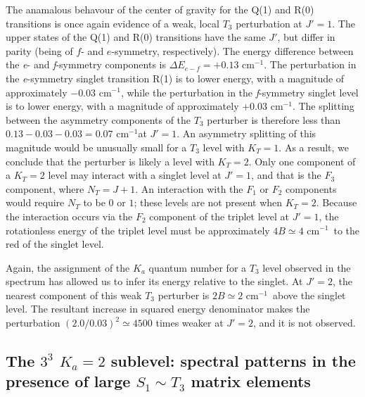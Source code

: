 \documentclass[12pt]{mitthesis}
\newcommand{\rcm}{cm$^{-1}$}
\newcommand{\Ka}[1]{$K_a\!\!=\!#1$}
\begin{document}
The anamalous behavour of the center of gravity for the Q(1) and R(0)
transitions is once again evidence of a weak, local $T_3$ perturbation
at $J'=1$.  The upper states of the Q(1) and R(0) transitions have the
same $J'$, but differ in parity (being of $f$- and $e$-symmetry,
respectively).  The energy difference between the \emph{e}- and
\emph{f}-symmetry components is $\Delta E_{e-f}=+0.13$ \rcm.  The
perturbation in the \emph{e}-symmetry singlet transition R(1) is to
lower energy, with a magnitude of approximately $-0.03$ \rcm, while
the perturbation in the \emph{f}-symmetry singlet level is to lower
energy, with a magnitude of approximately $+0.03$ \rcm.  The splitting
between the asymmetry components of the $T_3$ perturber is therefore
less than $0.13-0.03-0.03=0.07$ \rcm at $J'=1$.  An asymmetry
splitting of this magnitude would be unusually small for a $T_3$ level
with $K_T=1$.  As a result, we conclude that the perturber is likely a
level with $K_T=2$.  Only one component of a $K_T=2$ level may
interact with a singlet level at $J'=1$, and that is the $F_3$
component, where $N_T=J+1$.  An interaction with the $F_1$ or $F_2$
components would require $N_T$ to be $0$ or $1$; these levels are not
present when $K_T=2$.  Because the interaction occurs via the $F_2$
component of the triplet level at $J'=1$, the rotationless energy of
the triplet level must be approximately $4B \simeq 4$ \rcm\ to the red
of the singlet level.

Again, the assignment of the $K_a$ quantum number for a $T_3$ level
observed in the spectrum has allowed us to infer its energy relative
to the singlet.  At $J'=2$, the nearest component of this weak $T_3$
perturber is $2B \simeq 2$ \rcm\ above the singlet level.  The
resultant increase in squared energy denominator makes the
perturbation $(2.0/0.03)^2 \simeq 4500$ times weaker at $J'=2$, and it
is not observed.

%
% 











\subsection{The $3^3$ \Ka{2} sublevel: spectral patterns in the
  presence of large $S_1 \sim T_3$ matrix elements}

\end{document}
